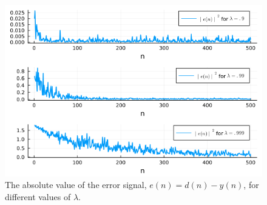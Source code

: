 \documentclass[12pt,a4paper]{article}
\begin{document}
\begin{figure}[H]
    \centering
    \includegraphics[scale=.6]{../figs/q5_error_signal.png}
    \caption{The absolute value of the error signal, \(e(n) = d(n) - y(n)\), for different values of \(\lambda\).}
    \label{fig:equalizer-error}
\end{figure}


% 
% 
\end{document}
